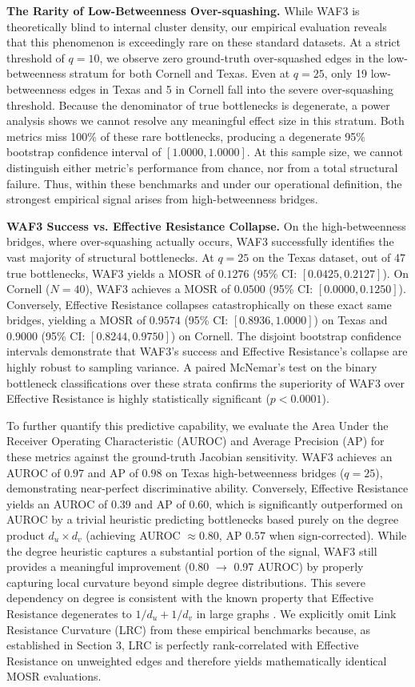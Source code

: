 \documentclass[10pt]{article} %
\begin{document}
\textbf{The Rarity of Low-Betweenness Over-squashing.}
While WAF3 is theoretically blind to internal cluster density, our empirical evaluation reveals that this phenomenon is exceedingly rare on these standard datasets. At a strict threshold of $q=10$, we observe zero ground-truth over-squashed edges in the low-betweenness stratum for both Cornell and Texas. Even at $q=25$, only 19 low-betweenness edges in Texas and 5 in Cornell fall into the severe over-squashing threshold. Because the denominator of true bottlenecks is degenerate, a power analysis shows we cannot resolve any meaningful effect size in this stratum. Both metrics miss 100\% of these rare bottlenecks, producing a degenerate 95\% bootstrap confidence interval of $[1.0000, 1.0000]$. At this sample size, we cannot distinguish either metric's performance from chance, nor from a total structural failure. Thus, within these benchmarks and under our operational definition, the strongest empirical signal arises from high-betweenness bridges.

\textbf{WAF3 Success vs. Effective Resistance Collapse.}
On the high-betweenness bridges, where over-squashing actually occurs, WAF3 successfully identifies the vast majority of structural bottlenecks. At $q=25$ on the Texas dataset, out of 47 true bottlenecks, WAF3 yields a MOSR of $0.1276$ (95\% CI: $[0.0425, 0.2127]$). On Cornell ($N=40$), WAF3 achieves a MOSR of $0.0500$ (95\% CI: $[0.0000, 0.1250]$). Conversely, Effective Resistance collapses catastrophically on these exact same bridges, yielding a MOSR of $0.9574$ (95\% CI: $[0.8936, 1.0000]$) on Texas and $0.9000$ (95\% CI: $[0.8244, 0.9750]$) on Cornell. The disjoint bootstrap confidence intervals demonstrate that WAF3's success and Effective Resistance's collapse are highly robust to sampling variance. A paired McNemar's test on the binary bottleneck classifications over these strata confirms the superiority of WAF3 over Effective Resistance is highly statistically significant ($p < 0.0001$).

To further quantify this predictive capability, we evaluate the Area Under the Receiver Operating Characteristic (AUROC) and Average Precision (AP) for these metrics against the ground-truth Jacobian sensitivity. WAF3 achieves an AUROC of $0.97$ and AP of $0.98$ on Texas high-betweenness bridges ($q=25$), demonstrating near-perfect discriminative ability. Conversely, Effective Resistance yields an AUROC of $0.39$ and AP of $0.60$, which is significantly outperformed on AUROC by a trivial heuristic predicting bottlenecks based purely on the degree product $d_u \times d_v$ (achieving AUROC $\approx 0.80$, AP $0.57$ when sign-corrected). While the degree heuristic captures a substantial portion of the signal, WAF3 still provides a meaningful improvement (0.80 $\to$ 0.97 AUROC) by properly capturing local curvature beyond simple degree distributions. This severe dependency on degree is consistent with the known property that Effective Resistance degenerates to $1/d_u + 1/d_v$ in large graphs \cite{VonLuxburg2014}. We explicitly omit Link Resistance Curvature (LRC) from these empirical benchmarks because, as established in Section 3, LRC is perfectly rank-correlated with Effective Resistance on unweighted edges and therefore yields mathematically identical MOSR evaluations.
\end{document}
